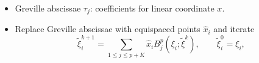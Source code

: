 \documentclass[compress]{beamer}
\begin{document}
{\begin{figure}
\begin{overlayarea}{\textwidth}{.5\textheight}
%
%
%
%
\end{overlayarea}
\label{fig:smoothedknots}
\end{figure}
\vspace{-1.25em}
\begin{itemize}
\item Greville abscissae $\tau_j$: coefficients for linear coordinate $x$.
\item Replace Greville abscissae with equispaced points $\widehat{x}_i$ and iterate 
\[
\tilde{\xi}^{k+1}_i = \sum_{1\leq j\leq p+K} \widehat{x}_i B^p_j(\xi_i;  \tilde{\xi}^k), \qquad \tilde{\xi}^0_i = \xi_i,
\]
\end{itemize}
}
\end{document}
